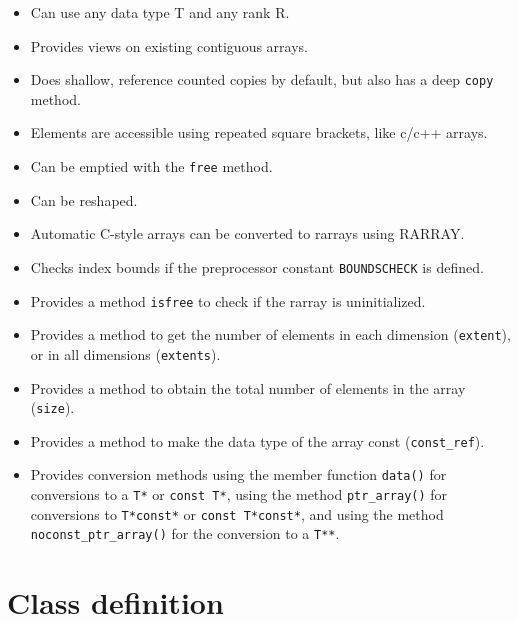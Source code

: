 \documentclass[12pt,twoside]{article}
\begin{document}
\begin{itemize}\itemsep0pt\parskip2pt
\item Can use any data type T and any rank R.
\item Provides views on existing contiguous arrays.
\item Does shallow, reference counted copies by default, but also has a
  deep {\tt copy} method.
\item Elements are accessible using repeated square brackets, like c/c++ arrays.
\item Can be emptied with the {\tt free} method.
\item Can be reshaped.
\item Automatic C-style arrays can be converted to rarrays using RARRAY.
\item Checks index bounds if the preprocessor
  constant {\tt BOUNDSCHECK} is defined. 
\item Provides a method {\tt isfree} to check if the rarray is uninitialized.
\item Provides a method to get the number of elements in each
  dimension (\texttt{extent}), or in all dimensions (\texttt{extents}).
\item Provides  a method to obtain the total number of elements in the
  array (\texttt{size}).
\item Provides a method to make the data type of the array const
  (\texttt{const\_ref}).
\item Provides conversion methods using the member
  function \texttt{data()} for conversions to a \texttt{T*} or
  \texttt{const T*}, using the method \texttt{ptr\_array()} for
  conversions to \texttt{T*const*} or \texttt{const T*const*}, and
  using the method \texttt{noconst\_ptr\_array()} for the conversion to a
  \texttt{T**}.
\end{itemize}

\section{Class definition}
\end{document}

